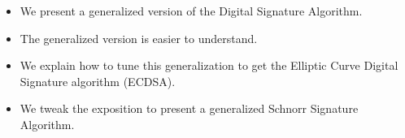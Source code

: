 \begin{frame}
\nocite{SeberryToTonien:aNewGenericDigitalSignatureAlgorithm}

\begin{itemize}
\item We present a generalized version of the Digital Signature Algorithm.
\item The generalized version is easier to understand.
\item We explain how to tune this generalization to get the Elliptic Curve Digital Signature algorithm (ECDSA).
\item We tweak the exposition to present a generalized Schnorr Signature Algorithm.		
\end{itemize}
\end{frame}